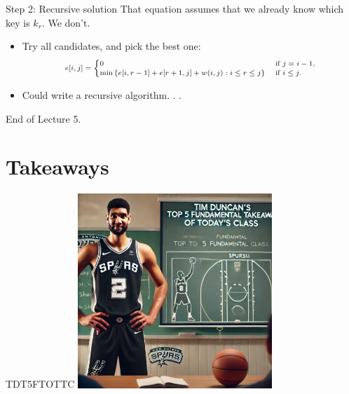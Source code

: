 \documentclass[aspectratio=169]{beamer}
\begin{document}
\begin{frame}{Step 2: Recursive solution}
    That equation assumes that we already know which key is $k_r$.  We don’t.
    \begin{itemize}
        \item Try all candidates, and pick the best one:
            \begin{equation*}
                \scriptsize
                \begin{align*}
                    e[i, j] =
                        \begin{cases}
                            0 & \text{ if } j = i - 1 \text{,} \\
                            \min \left \{ e[i, r-1] + e[r+1, j] + w(i, j):i \leq r \leq j \right \} & \text{ if } i \leq j \text{.}
                        \end{cases}
                \end{align*}
            \end{equation*}
        \item Could write a recursive algorithm. . .
    \end{itemize}
\end{frame}


\begin{frame}{}
    \centering
    \Huge End of Lecture 5.
\end{frame}

\section*{Takeaways}

\begin{frame}{TDT5FTOTTC}
    \centering
    \includegraphics[width=0.55\textwidth]{figures/tim.png}
\end{frame}
\end{document}
